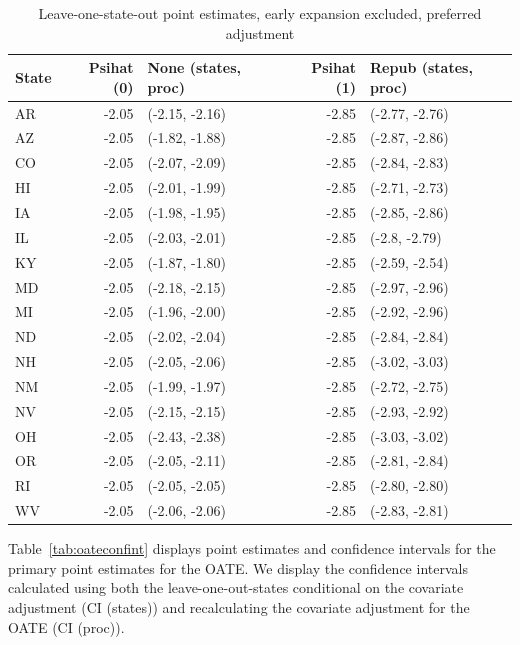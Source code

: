 \begin{table}[ht]
\centering
   \caption{Leave-one-state-out point estimates, early expansion excluded, preferred adjustment}
    \label{tab:loostatec2}
\begin{tabular}{lrlrl}
  \hline
State & Psihat (0) & None (states, proc) & Psihat (1) & Repub (states, proc) \\ 
  \hline
AR & -2.05 & (-2.15, -2.16) & -2.85 & (-2.77, -2.76) \\ 
  AZ & -2.05 & (-1.82, -1.88) & -2.85 & (-2.87, -2.86) \\ 
  CO & -2.05 & (-2.07, -2.09) & -2.85 & (-2.84, -2.83) \\ 
  HI & -2.05 & (-2.01, -1.99) & -2.85 & (-2.71, -2.73) \\ 
  IA & -2.05 & (-1.98, -1.95) & -2.85 & (-2.85, -2.86) \\ 
  IL & -2.05 & (-2.03, -2.01) & -2.85 & (-2.8, -2.79) \\ 
  KY & -2.05 & (-1.87, -1.80) & -2.85 & (-2.59, -2.54) \\ 
  MD & -2.05 & (-2.18, -2.15) & -2.85 & (-2.97, -2.96) \\ 
  MI & -2.05 & (-1.96, -2.00) & -2.85 & (-2.92, -2.96) \\ 
  ND & -2.05 & (-2.02, -2.04) & -2.85 & (-2.84, -2.84) \\ 
  NH & -2.05 & (-2.05, -2.06) & -2.85 & (-3.02, -3.03) \\ 
  NM & -2.05 & (-1.99, -1.97) & -2.85 & (-2.72, -2.75) \\ 
  NV & -2.05 & (-2.15, -2.15) & -2.85 & (-2.93, -2.92) \\ 
  OH & -2.05 & (-2.43, -2.38) & -2.85 & (-3.03, -3.02) \\ 
  OR & -2.05 & (-2.05, -2.11) & -2.85 & (-2.81, -2.84) \\ 
  RI & -2.05 & (-2.05, -2.05) & -2.85 & (-2.80, -2.80) \\ 
  WV & -2.05 & (-2.06, -2.06) & -2.85 & (-2.83, -2.81) \\ 
   \hline
\end{tabular}
\end{table}

Table~\ref{tab:oateconfint} displays point estimates and confidence intervals for the primary point estimates for the OATE. We display the confidence intervals calculated using both the leave-one-out-states conditional on the covariate adjustment (CI (states)) and recalculating the covariate adjustment for the OATE (CI (proc)). 

